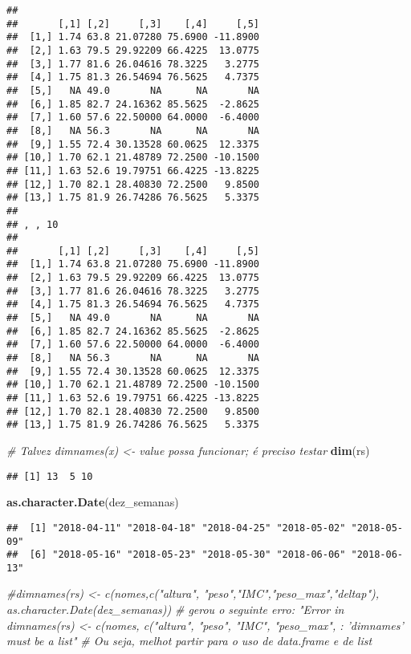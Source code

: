 \documentclass[]{article}
\newenvironment{Shaded}{\begin{snugshade}}{\end{snugshade}}
\newcommand{\KeywordTok}[1]{\textcolor[rgb]{0.13,0.29,0.53}{\textbf{#1}}}
\newcommand{\CommentTok}[1]{\textcolor[rgb]{0.56,0.35,0.01}{\textit{#1}}}
\newcommand{\NormalTok}[1]{#1}
\begin{document}
\begin{verbatim}
## 
##       [,1] [,2]     [,3]    [,4]     [,5]
##  [1,] 1.74 63.8 21.07280 75.6900 -11.8900
##  [2,] 1.63 79.5 29.92209 66.4225  13.0775
##  [3,] 1.77 81.6 26.04616 78.3225   3.2775
##  [4,] 1.75 81.3 26.54694 76.5625   4.7375
##  [5,]   NA 49.0       NA      NA       NA
##  [6,] 1.85 82.7 24.16362 85.5625  -2.8625
##  [7,] 1.60 57.6 22.50000 64.0000  -6.4000
##  [8,]   NA 56.3       NA      NA       NA
##  [9,] 1.55 72.4 30.13528 60.0625  12.3375
## [10,] 1.70 62.1 21.48789 72.2500 -10.1500
## [11,] 1.63 52.6 19.79751 66.4225 -13.8225
## [12,] 1.70 82.1 28.40830 72.2500   9.8500
## [13,] 1.75 81.9 26.74286 76.5625   5.3375
## 
## , , 10
## 
##       [,1] [,2]     [,3]    [,4]     [,5]
##  [1,] 1.74 63.8 21.07280 75.6900 -11.8900
##  [2,] 1.63 79.5 29.92209 66.4225  13.0775
##  [3,] 1.77 81.6 26.04616 78.3225   3.2775
##  [4,] 1.75 81.3 26.54694 76.5625   4.7375
##  [5,]   NA 49.0       NA      NA       NA
##  [6,] 1.85 82.7 24.16362 85.5625  -2.8625
##  [7,] 1.60 57.6 22.50000 64.0000  -6.4000
##  [8,]   NA 56.3       NA      NA       NA
##  [9,] 1.55 72.4 30.13528 60.0625  12.3375
## [10,] 1.70 62.1 21.48789 72.2500 -10.1500
## [11,] 1.63 52.6 19.79751 66.4225 -13.8225
## [12,] 1.70 82.1 28.40830 72.2500   9.8500
## [13,] 1.75 81.9 26.74286 76.5625   5.3375
\end{verbatim}

\begin{Shaded}
\begin{Highlighting}[]
\CommentTok{# Talvez dimnames(x) <- value possa funcionar; é preciso testar}
\KeywordTok{dim}\NormalTok{(rs)}
\end{Highlighting}
\end{Shaded}

\begin{verbatim}
## [1] 13  5 10
\end{verbatim}

\begin{Shaded}
\begin{Highlighting}[]
\KeywordTok{as.character.Date}\NormalTok{(dez_semanas)}
\end{Highlighting}
\end{Shaded}

\begin{verbatim}
##  [1] "2018-04-11" "2018-04-18" "2018-04-25" "2018-05-02" "2018-05-09"
##  [6] "2018-05-16" "2018-05-23" "2018-05-30" "2018-06-06" "2018-06-13"
\end{verbatim}

\begin{Shaded}
\begin{Highlighting}[]
\CommentTok{#dimnames(rs) <- c(nomes,c("altura", "peso","IMC","peso_max","deltap"), as.character.Date(dez_semanas))}
\CommentTok{# gerou o seguinte erro: "Error in dimnames(rs) <- c(nomes, c("altura", "peso", "IMC", "peso_max",  : 'dimnames' must be a list"}
\CommentTok{# Ou seja, melhot partir para o uso de data.frame e de list}
\end{Highlighting}
\end{Shaded}
\end{document}
